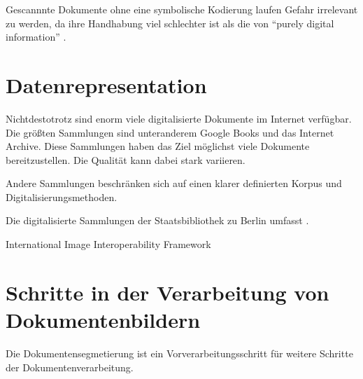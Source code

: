 Gescannnte Dokumente ohne eine symbolische Kodierung laufen Gefahr irrelevant zu werden,
da ihre Handhabung viel schlechter ist als die von ``purely digital information'' \parencite[10]{BairdDigitallibrariesdocument2003}.
 
\section{Datenrepresentation}

Nichtdestotrotz sind enorm viele digitalisierte Dokumente im Internet verfügbar.
Die größten Sammlungen sind unteranderem Google Books und das Internet Archive.
Diese Sammlungen haben das Ziel möglichst viele Dokumente bereitzustellen. 
Die Qualität kann dabei stark variieren.

Andere Sammlungen beschränken sich auf einen klarer definierten Korpus und Digitalisierungsmethoden.

Die digitalisierte Sammlungen der Staatsbibliothek zu Berlin \cite{StaatsbibliothekzuBerlinDigitalisierteSammlungenStaatsbibliothek2016} umfasst .



International Image Interoperability Framework \cite{IIIFInternationalImageInteroperability2018}


\section{Schritte in der Verarbeitung von Dokumentenbildern}
Die Dokumentensegmetierung ist ein Vorverarbeitungsschritt für weitere Schritte der Dokumentenverarbeitung.
